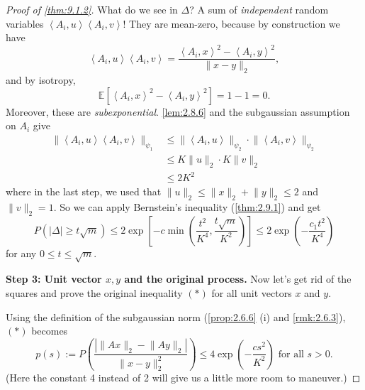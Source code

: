\begin{proof}[Proof of \cref{thm:9.1.2}]
What do we see in $\Delta$? A sum of \textit{independent} random variables $\left\langle A_i, u \right\rangle 
\left\langle A_i, v \right\rangle$! They are mean-zero, because by construction we have 
\[ \left\langle A_i, u \right\rangle \left\langle A_i, v \right\rangle = 
\frac{\left\langle A_i, x \right\rangle^2 - \left\langle A_i, y \right\rangle^2}{\lVert x - y \rVert_{2}}, \]
and by isotropy, 
\[ \mathbb{E}\left[ \left\langle A_i, x \right\rangle^2 - \left\langle A_i, y \right\rangle^2 \right] 
= 1 - 1 = 0. \]
Moreover, these are \textit{subexponential}. \cref{lem:2.8.6} and the subgaussian assumption on $A_i$ give 
\begin{align*}
	\lVert \left\langle A_i, u \right\rangle \left\langle A_i, v \right\rangle \rVert_{\psi_1} 
	&\leq \lVert \left\langle A_i, u \right\rangle \rVert_{\psi_2} \cdot 
	\lVert \left\langle A_i, v \right\rangle \rVert_{\psi_2} \\
	&\leq K \lVert u \rVert_{2} \cdot K \lVert v \rVert_{2} \\
	&\leq 2K^2
\end{align*}
where in the last step, we used that $\lVert u \rVert_{2} \leq \lVert x \rVert_{2} + \lVert y \rVert_{2} \leq 2$ 
and $\lVert v \rVert_{2} = 1$. So we can apply Bernstein's inequality (\cref{thm:2.9.1}) and get 
\[ P(|\Delta| \geq t \sqrt{m}) \leq 2 \exp{\left[ -c \min_{}\left( \frac{t^2}{K^4}, \frac{t \sqrt{m}}{K^2} 
\right) \right]} \leq 2 \exp{\left( -\frac{c_1 t^2}{K^4} \right)} \]
for any $0 \leq t \leq \sqrt{m}$.

\textbf{Step 3: Unit vector $x, y$ and the original process.} Now let's get rid of the squares and prove the 
original inequality $(*)$ for all unit vectors $x$ and $y$.

Using the definition of the subgaussian norm (\cref{prop:2.6.6} (i) and \cref{rmk:2.6.3}), $(*)$ becomes 
\[ p(s) := P \left( \frac{|\lVert Ax \rVert_{2} - \lVert Ay \rVert_{2}|}{\lVert x - y \rVert_{2}^2} \right) 
\leq 4 \exp{\left( -\frac{cs^2}{K^2} \right)} \text{ for all } s > 0. \]
(Here the constant 4 instead of 2 will give us a little more room to maneuver.)


\end{proof}
